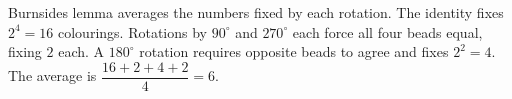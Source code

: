 Burnside\textquotesingle s lemma averages the numbers fixed by each rotation. The identity fixes $2^4=16$ colourings. Rotations by $90^\circ$ and $270^\circ$ each force all four beads equal, fixing $2$ each. A $180^\circ$ rotation requires opposite beads to agree and fixes $2^2=4$. The average is $\dfrac{16+2+4+2}{4}=\boxed6$.
